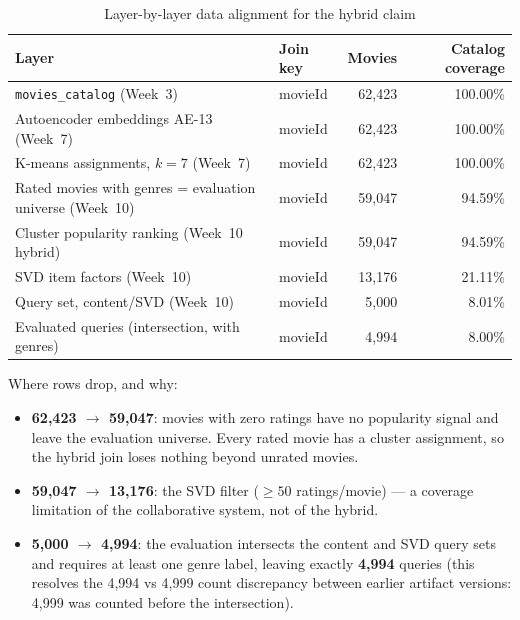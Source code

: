 \documentclass[12pt,a4paper]{article}
\begin{document}
\begin{table}[H]
\centering
\small
\caption{Layer-by-layer data alignment for the hybrid claim}
\label{tab:data_alignment}
\begin{tabular}{p{6.8cm}lrr}
\toprule
\textbf{Layer} & \textbf{Join key} & \textbf{Movies} & \textbf{Catalog coverage} \\
\midrule
\texttt{movies\_catalog} (Week~3)                          & movieId & 62,423 & 100.00\% \\
Autoencoder embeddings AE-13 (Week~7)                      & movieId & 62,423 & 100.00\% \\
K-means assignments, $k=7$ (Week~7)                        & movieId & 62,423 & 100.00\% \\
Rated movies with genres = evaluation universe (Week~10)   & movieId & 59,047 & 94.59\% \\
Cluster popularity ranking (Week~10 hybrid)                & movieId & 59,047 & 94.59\% \\
SVD item factors (Week~10)                                 & movieId & 13,176 & 21.11\% \\
Query set, content/SVD (Week~10)                           & movieId &  5,000 & 8.01\% \\
Evaluated queries (intersection, with genres)              & movieId &  4,994 & 8.00\% \\
\bottomrule
\end{tabular}
\end{table}

Where rows drop, and why:
\begin{itemize}[nosep]
  \item \textbf{62,423 $\rightarrow$ 59,047}: movies with zero ratings have no popularity
    signal and leave the evaluation universe. Every rated movie has a cluster assignment,
    so the hybrid join loses nothing beyond unrated movies.
  \item \textbf{59,047 $\rightarrow$ 13,176}: the SVD filter ($\geq 50$ ratings/movie) ---
    a coverage limitation of the collaborative system, not of the hybrid.
  \item \textbf{5,000 $\rightarrow$ 4,994}: the evaluation intersects the content and SVD
    query sets and requires at least one genre label, leaving exactly \textbf{4,994} queries
    (this resolves the 4,994 vs 4,999 count discrepancy between earlier artifact versions:
    4,999 was counted before the intersection).
\end{itemize}
\end{document}
